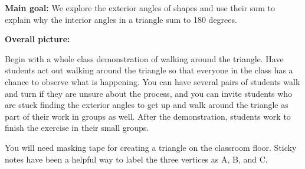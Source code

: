 \documentclass[nooutcomes, noauthor]{ximera}
\begin{document}
\begin{instructorNotes}


{\bf Main goal:} We explore the exterior angles of shapes and use their sum to explain why the interior angles in a triangle sum to 180 degrees.


{\bf Overall picture:} 




Begin with a whole class demonstration of walking around the triangle. Have students act out walking around the triangle so that everyone in the class has a chance to observe what is happening. You can have several pairs of students walk and turn if they are unsure about the process, and you can invite students who are stuck finding the exterior angles to get up and walk around the triangle as part of their work in groups as well.   After the demonstration, students work to finish the exercise in their small groups.

You will need masking tape for creating a triangle on the classroom floor. Sticky notes have been a helpful way to label the three vertices as A, B, and C.


\end{instructorNotes}
\end{document}
